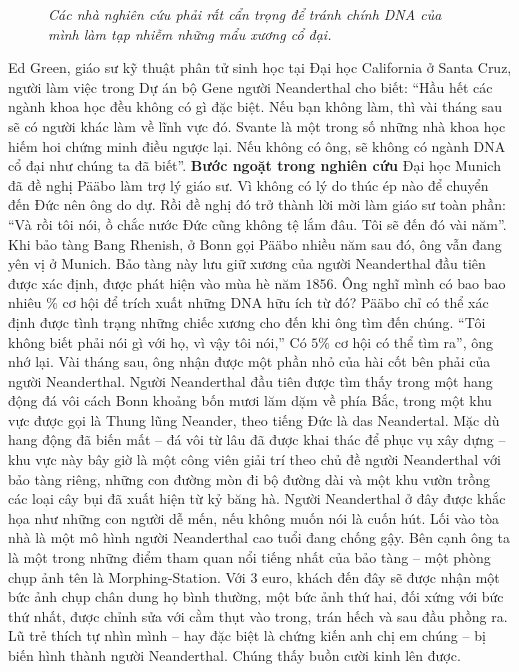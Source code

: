 \begin{multicols}{2}
\begin{figure}[H]
		\caption{\small\textit{\color{timhieukhoahoc}Các nhà nghiên cứu phải rất cẩn trọng để tránh chính DNA của mình làm tạp nhiễm những mẩu xương cổ đại.}}
		\vspace*{-10pt}
	\end{figure}
	Ed Green, giáo sư kỹ thuật phân tử sinh học tại Đại học California ở Santa Cruz, người làm việc trong Dự án bộ Gene người Neanderthal cho biết: “Hầu hết các ngành khoa học đều không có gì đặc biệt. Nếu bạn không làm, thì vài tháng sau sẽ có người khác làm về lĩnh vực đó. Svante là một trong số những nhà khoa học hiếm hoi chứng minh điều ngược lại. Nếu không có ông, sẽ không có ngành DNA cổ đại như chúng ta đã biết”.
	\vskip 0.1cm
	\textbf{\color{timhieukhoahoc}Bước ngoặt trong nghiên cứu}
	\vskip 0.1cm
	Đại học Munich đã đề nghị Pääbo làm trợ lý giáo sư. Vì không có lý do thúc ép nào để chuyển đến Đức nên ông do dự. Rồi đề nghị đó trở thành lời mời làm giáo sư toàn phần: “Và rồi tôi nói, ồ chắc nước Đức cũng không tệ lắm đâu. Tôi sẽ đến đó vài năm”.
	\vskip 0.1cm
	Khi bảo tàng Bang Rhenish, ở Bonn gọi Pääbo nhiều năm sau đó, ông vẫn đang yên vị ở Munich. Bảo tàng này lưu giữ xương của người Neanderthal đầu tiên được xác định, được phát hiện vào mùa hè năm $1856$. Ông nghĩ mình có bao bao nhiêu $\%$ cơ hội để trích xuất những DNA hữu ích từ đó? Pääbo chỉ có thể xác định được tình trạng những chiếc xương cho đến khi ông tìm đến chúng.
	\vskip 0.1cm
	“Tôi không biết phải nói gì với họ, vì vậy tôi nói,” Có $5\%$ cơ hội có thể tìm ra”, ông nhớ lại. Vài tháng sau, ông nhận được một phần nhỏ của hài cốt bên phải của người Neanderthal.
	\vskip 0.1cm
	Người Neanderthal đầu tiên được tìm thấy trong một hang động đá vôi cách Bonn khoảng bốn mươi lăm dặm về phía Bắc, trong một khu vực được gọi là Thung lũng Neander, theo tiếng Đức là das Neandertal. Mặc dù hang động đã biến mất -- đá vôi từ lâu đã được khai thác để phục vụ xây dựng -- khu vực này bây giờ là một công viên giải trí theo chủ đề người Neanderthal với bảo tàng riêng, những con đường mòn đi bộ đường dài và một khu vườn trồng các loại cây bụi đã xuất hiện từ kỷ băng hà. Người Neanderthal ở đây được khắc họa như những con người dễ mến, nếu không muốn nói là cuốn hút. Lối vào tòa nhà là một mô hình người Neanderthal cao tuổi đang chống gậy. Bên cạnh ông ta là một trong những điểm tham quan nổi tiếng nhất của bảo tàng -- một phòng chụp ảnh tên là Morphing-Station. Với $3$ euro, khách đến đây sẽ được nhận một bức ảnh chụp chân dung họ bình thường, một bức ảnh thứ hai, đối xứng với bức thứ nhất, được chỉnh sửa với cằm thụt vào trong, trán hếch và sau đầu phồng ra. Lũ trẻ thích tự nhìn mình -- hay đặc biệt là chứng kiến anh chị em chúng -- bị biến hình thành người Neanderthal. Chúng thấy buồn cười kinh lên được.

\end{multicols}

